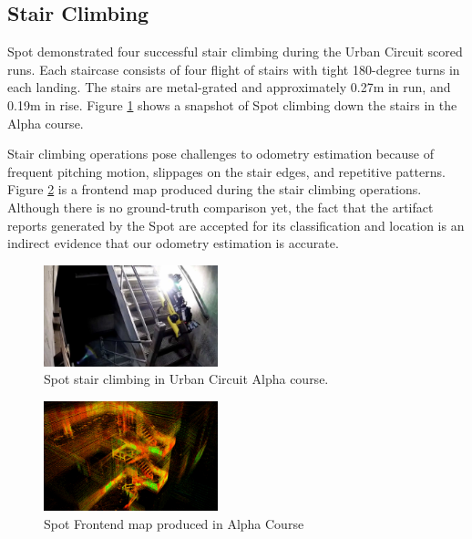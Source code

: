 \documentclass[a4paper, 10pt, conference]{ieeeconf}      %
\begin{document}
\subsection{Stair Climbing}
Spot demonstrated four successful stair climbing during the Urban Circuit scored runs. Each staircase consists of four flight of stairs with tight 180-degree turns in each landing. The stairs are metal-grated and approximately 0.27m in run, and 0.19m in rise. Figure \ref{fig:spot_stair_climb} shows a snapshot of Spot climbing down the stairs in the Alpha course.

Stair climbing operations pose challenges to odometry estimation because of frequent pitching motion,  slippages on the stair edges, and repetitive patterns. Figure \ref{fig:alpha_course_stairs_map} is a frontend map produced during the stair climbing operations. Although there is no ground-truth comparison yet, the fact that the artifact reports generated by the Spot are accepted for its classification and location is an indirect evidence that our odometry estimation is accurate.


\begin{figure}[t]
  \centering
  \includegraphics[width=0.45\textwidth]{spot_iros/graphics/spot_stairclimbing2.jpg}
  \caption{Spot stair climbing in Urban Circuit Alpha course.}
  \label{fig:spot_stair_climb}
\end{figure}

\begin{figure}[t]  %
  \centering
  \includegraphics[width=0.45\textwidth]{spot_iros/graphics/spot_alpha_course_stairs.PNG}
  \caption{Spot Frontend map produced in Alpha Course}
  \label{fig:alpha_course_stairs_map}
\end{figure}
\end{document}
